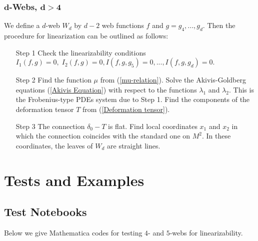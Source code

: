 \documentclass{article}
\begin{document}
\subsubsection{$\boldsymbol{d}$-Webs, $\boldsymbol{d>4}$}

We define a $d$-web $W_{d}$ by $d-2$ web functions $f$ and $%
g=g_{4},...,g_{d}.$ Then the procedure for linearization can be outlined as
follows:

\begin{itemize}
\item[Step 1] Check the linearizability conditions $I_{1}\left( f,g\right)
=0,\;I_{2}\left( f,g\right) =0,I(f,g,g_{5})=0,...,I(f,g,g_{d})=0.$

\item[Step 2] Find the function $\mu $ from (\ref{mu-relation}). Solve the
Akivis-Goldberg equations (\ref{Akivis Equation}) with respect to the
functions $\lambda _{1}$ and $\lambda _{2}$. This is the Frobenius-type PDEs
system due to Step 1. Find the components of the deformation tensor $T$ from
(\ref{Deformation tensor}).

\item[Step 3] The connection $\delta _{0}-T$ is flat. Find local coordinates
$x_{1}$ and $x_{2}$ in which the connection coincides with the standard one
on $M^{2}.$ In these coordinates, the leaves of $W_{d}$ are straight lines.
\end{itemize}

\section{ Tests and Examples}

\subsection{Test Notebooks}

Below we give Mathematica codes for testing $4$- and $5$-webs for
linearizability.
\end{document}
